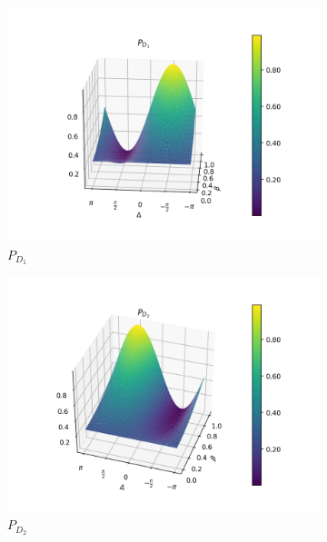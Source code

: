 \documentclass{book}
\begin{document}
\begin{figure}[H]
\centering
\begin{subfigure}[b]{0.30\linewidth}
\includegraphics[width=\linewidth]{images/pd1_2.png}
\caption{$P_{D_{1}}$}
\end{subfigure}
\begin{subfigure}[b]{0.30\linewidth}
\includegraphics[width=\linewidth]{images/pd2_2.png}
\caption{$P_{D_{2}}$ }
\label{fig:BS1}
\end{subfigure}
\begin{subfigure}[b]{0.30\linewidth}

\end{subfigure}
\end{figure}
\end{document}
